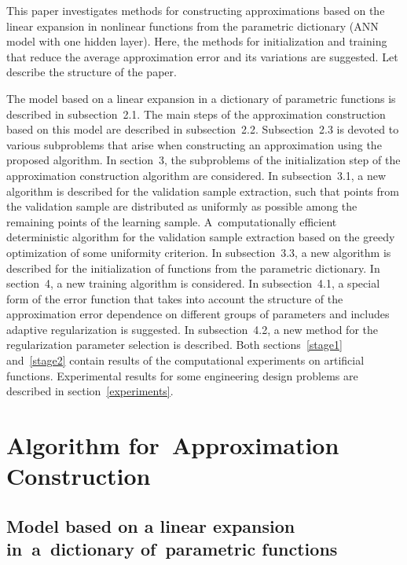 \begin{multicols}{2}
This paper investigates methods for constructing approximations based on the 
linear expansion in nonlinear functions from the parametric dictionary (ANN model 
with one hidden layer).
Here, the methods for initialization and training that reduce the average approximation 
error and its variations are suggested. Let describe the structure of the paper.

The model based on a linear expansion in a dictionary of parametric functions is described in 
subsection~2.1. The main steps of the approximation construction based on
  this model are described in subsection~2.2.
Subsection~2.3 is devoted to various subproblems that arise when 
constructing an approximation using the proposed algorithm.
In section~3, the subproblems of the initialization step
 of the approximation construction algorithm are considered. 
In subsection~3.1, a new algorithm is described for the validation sample 
extraction, such that points from the validation sample are distributed as uniformly
 as possible among the remaining points of the learning sample. 
 A~computationally efficient deterministic algorithm for the validation sample extraction 
 based on the greedy optimization of some uniformity criterion.
In subsection~3.3, a new algorithm is described for the initialization of functions 
from the parametric dictionary. 
In section~4, a new training algorithm is considered. 
In subsection~4.1, a special form of the error function that takes 
into account the structure of the approximation error dependence on different groups 
of parameters and includes adaptive regularization is suggested.
In subsection~4.2, a new method for the regularization 
parameter selection is described.
Both sections~\ref{stage1} and~\ref{stage2} contain results of the computational experiments on artificial functions.
Experimental results for some engineering design problems are described 
in section~\ref{experiments}.
{

}

\section{Algorithm for~Approximation Construction}

\subsection{Model based on a linear expansion in~a~dictionary of~parametric functions}
\label{model}


\end{multicols}
